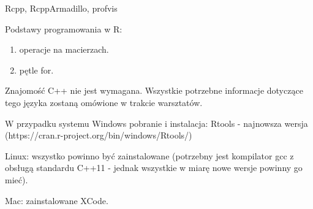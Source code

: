\documentclass[\main/boa.tex]{subfiles}
\begin{document}
\pakiety Rcpp, RcppArmadillo, profvis

\umiejetnosci Podstawy programowania w R:
\begin{enumerate}
	\item operacje na macierzach.
	\item pętle for.
\end{enumerate}
Znajomość C++ nie jest wymagana. Wszystkie potrzebne informacje dotyczące tego języka zostaną omówione w trakcie warsztatów.

\wymagania W przypadku systemu Windows pobranie i instalacja: Rtools - najnowsza wersja (https://cran.r-project.org/bin/windows/Rtools/)

Linux: wszystko powinno być zainstalowane (potrzebny jest kompilator gcc z obsługą standardu C++11 - jednak wszystkie w miarę nowe wersje powinny go mieć).

Mac: zainstalowane XCode.
\end{document}
